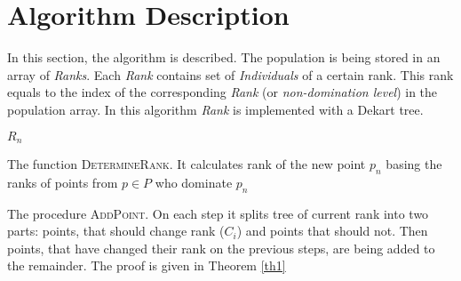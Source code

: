 \documentclass{article}
\begin{document}
\section{Algorithm Description}\label{sec-algo}
In this section, the algorithm is described.
The population is being stored in an array of \textit{Ranks}.
Each \textit{Rank} contains set of \textit{Individuals} of a certain rank. 
This rank equals to the index of the corresponding \textit{Rank} (or
\textit{non-domination level}) in the population array.
In this algorithm \textit{Rank} is implemented with a Dekart tree.

\begin{algorithm}[H]
\begin{algorithmic}[1]
	    \EndIf
	\EndFor
	\State\Return $R_n$
\EndFunction
\end{algorithmic}
\caption{The function \textsc{DetermineRank}. It calculates rank of the new
point $p_n$ basing the ranks of points from $p \in P$ who dominate $p_n$}
\label{DetermineRank}
\end{algorithm}

\begin{algorithm}[H]
\begin{algorithmic}[1]
	 \Return
    \Else
       			\State\Return
       		\EndIf
        \EndWhile
    \EndIf
\EndProcedure
\end{algorithmic}
\caption{The procedure \textsc{AddPoint}. On each step it splits tree of
current rank into two parts: points, that should change rank ($C_i$) and points
that should not. Then points, that have changed their rank on the previous steps,
are being added to the remainder. The proof is given in Theorem \ref{th1}}
\label{AddPoint}
\end{algorithm}
\end{document}

